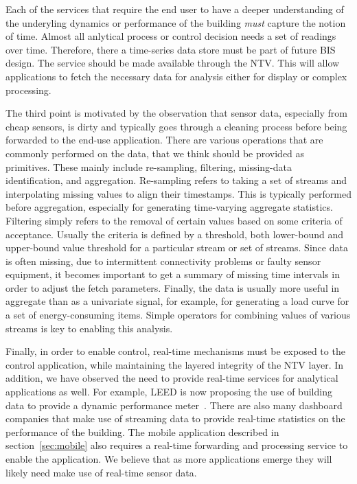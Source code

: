 Each of the services that require the end user to have a deeper understanding of the underyling dynamics or performance
of the building \emph{must} capture the notion of time.  Almost all anlytical process or control decision needs a set of readings
over time.  Therefore, there a time-series data store must be part of future BIS design.  The service should be made available
through the NTV.  This will allow applications to fetch the necessary data for analysis either for display or complex processing.

The third point is motivated by the observation that sensor data, especially from cheap sensors, is dirty and typically goes
through a cleaning process before being forwarded to the end-use application.  There are various operations that are commonly
performed on the data, that we think should be provided as primitives.  These mainly include re-sampling, filtering,  
missing-data identification, and aggregation.  Re-sampling refers to taking a set of streams and interpolating missing values to 
align their timestamps.  This is typically performed before aggregation, especially for generating time-varying aggregate statistics.
Filtering simply refers to the removal of certain values based on some criteria of acceptance.  Usually the criteria is defined
by a threshold, both lower-bound and upper-bound value threshold for a particular stream or set of streams.
Since data is often missing, due to intermittent connectivity problems or faulty sensor equipment, it becomes important to 
get a summary of missing time intervals in order to adjust the fetch parameters.  Finally, the data is usually more
useful in aggregate than as a univariate signal, for example, for generating a load curve for a set of energy-consuming items.
Simple operators for combining values of various streams is key to enabling this analysis.

Finally, in order to enable control, real-time mechanisms must be exposed to the control application, while maintaining the 
layered integrity of the NTV layer.  In addition, we have observed the need to provide real-time services for analytical applications
as well.  For example, LEED is now proposing the use of building data to provide a dynamic performance meter~\cite{DynamicLeed}.
There are also many dashboard companies that make use of streaming data to provide real-time statistics on the performance of the
building.  The mobile application described in section~\ref{sec:mobile} also requires a real-time forwarding and processing service to
enable the application.  We believe that as more applications emerge they will likely need make use of real-time sensor data.


